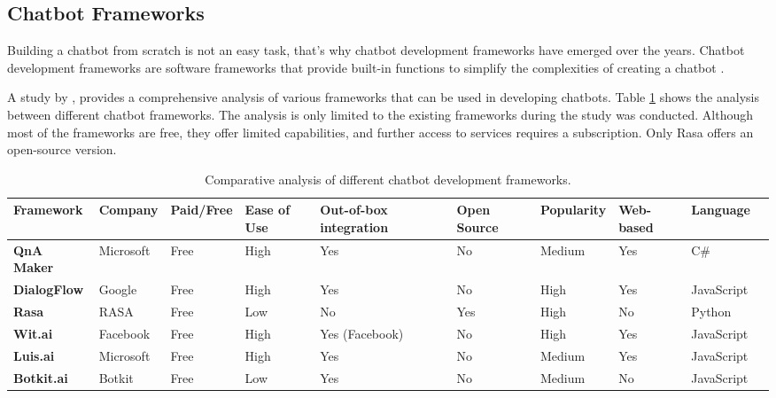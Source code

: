 \subsection{Chatbot Frameworks}

Building a chatbot from scratch is not an easy task, that’s why chatbot development frameworks have emerged over the years. Chatbot development frameworks are software frameworks that provide built-in functions to simplify the complexities of creating a chatbot \cite{geekforgeeks2024}. 

A study by \cite{omaima2020}, provides a comprehensive analysis of various frameworks that can be used in developing chatbots. Table \ref{Tab: framework_comparison} shows the analysis between different chatbot frameworks. The analysis is only limited to the existing frameworks during the study was conducted. Although most of the frameworks are free, they offer limited capabilities, and further access to services requires a subscription. Only Rasa offers an open-source version.

\newpage

\begin{table}
	\begin{adjustbox}{max width=\textwidth}
		\begin{tabular}{|p{2.6cm}|p{2.1cm}|p{2cm}|p{2.1cm}|p{2.4cm}|p{2cm}|p{2cm}|p{2cm}|p{2cm}|p{2.3cm}|}
		\hline
		\textbf{Framework} 
		& \textbf{Company} 
		& \textbf{Paid/Free} 
		& \textbf{Ease of Use} 
		& \textbf{Out-of-box integration} 
		& \textbf{Open Source} 
		& \textbf{Popularity} 
		& \textbf{Web-based} 
		& \textbf{Language} 
		\\ \hline
		\textbf{QnA Maker} 
		& Microsoft 
		& Free 
		& High 
		& Yes 
		& No 
		& Medium 
		& Yes 
		& C\# 
		\\ \hline
		\textbf{DialogFlow} 
		& Google 
		& Free 
		& High 
		& Yes 
		& No 
		& High 
		& Yes 
		& JavaScript 
		\\ \hline
		\textbf{Rasa} 
		& RASA 
		& Free 
		& Low 
		& No 
		& Yes 
		& High 
		& No 
		& Python 
		\\ \hline
		\textbf{Wit.ai} 
		& Facebook 
		& Free 
		& High 
		& Yes (Facebook) 
		& No 
		& High 
		& Yes 
		& JavaScript 
		\\
		\hline
		\textbf{Luis.ai} 
		& Microsoft 
		& Free 
		& High 
		& Yes 
		& No 
		& Medium 
		& Yes 
		& JavaScript 
		\\
		\hline
		\textbf{Botkit.ai} 
		& Botkit 
		& Free 
		& Low 
		& Yes 
		& No 
		& Medium 
		& No 
		& JavaScript 
		\\
		\hline
		\end{tabular}
	\end{adjustbox}
	\caption{Comparative analysis of different chatbot development frameworks.}
	\label{Tab: framework_comparison}
\end{table}

